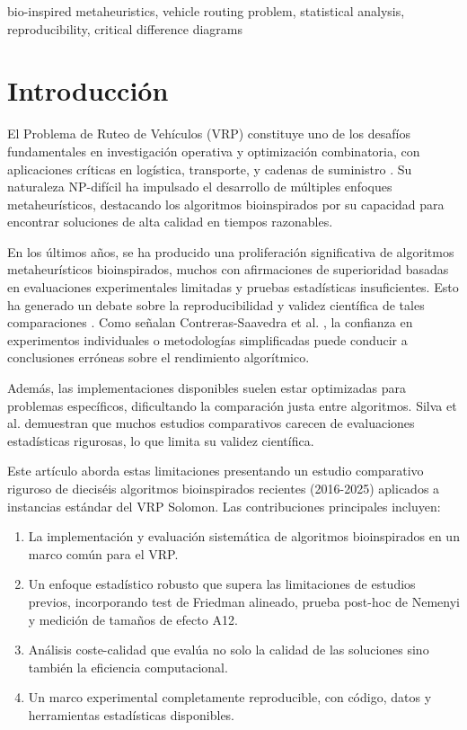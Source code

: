 \documentclass[conference,a4paper]{IEEEtran}
\begin{document}
\begin{IEEEkeywords}
bio-inspired metaheuristics, vehicle routing problem, statistical analysis, reproducibility, critical difference diagrams
\end{IEEEkeywords}


\section{Introducción}
El Problema de Ruteo de Vehículos (VRP) constituye uno de los desafíos fundamentales en investigación operativa y optimización combinatoria, con aplicaciones críticas en logística, transporte, y cadenas de suministro \cite{Mirjalili2016WOA}. Su naturaleza NP-difícil ha impulsado el desarrollo de múltiples enfoques metaheurísticos, destacando los algoritmos bioinspirados por su capacidad para encontrar soluciones de alta calidad en tiempos razonables.

En los últimos años, se ha producido una proliferación significativa de algoritmos metaheurísticos bioinspirados, muchos con afirmaciones de superioridad basadas en evaluaciones experimentales limitadas y pruebas estadísticas insuficientes. Esto ha generado un debate sobre la reproducibilidad y validez científica de tales comparaciones \cite{Li2020SMA}. Como señalan Contreras-Saavedra et al. \cite{Contreras2024CD}, la confianza en experimentos individuales o metodologías simplificadas puede conducir a conclusiones erróneas sobre el rendimiento algorítmico.

Además, las implementaciones disponibles suelen estar optimizadas para problemas específicos, dificultando la comparación justa entre algoritmos. Silva et al. \cite{Silva2023VRP} demuestran que muchos estudios comparativos carecen de evaluaciones estadísticas rigurosas, lo que limita su validez científica.

Este artículo aborda estas limitaciones presentando un estudio comparativo riguroso de dieciséis algoritmos bioinspirados recientes (2016-2025) aplicados a instancias estándar del VRP Solomon. Las contribuciones principales incluyen:

\begin{enumerate}
\item La implementación y evaluación sistemática de algoritmos bioinspirados en un marco común para el VRP.
\item Un enfoque estadístico robusto que supera las limitaciones de estudios previos, incorporando test de Friedman alineado, prueba post-hoc de Nemenyi y medición de tamaños de efecto A12.
\item Análisis coste-calidad que evalúa no solo la calidad de las soluciones sino también la eficiencia computacional.
\item Un marco experimental completamente reproducible, con código, datos y herramientas estadísticas disponibles.
\end{enumerate}
\end{document}

